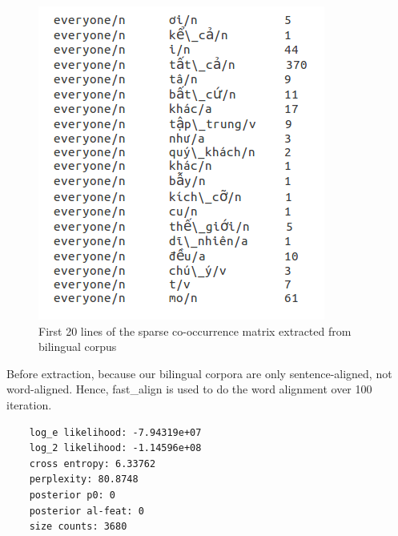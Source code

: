 \documentclass[12pt]{article}
\begin{document}
\begin{figure}[H]
	\centering
	\includegraphics[scale=0.7]{bilingual_sparse_matrix}
	\caption{First 20 lines of the sparse co-occurrence matrix extracted from bilingual corpus}
\end{figure}

Before extraction, because our bilingual corpora are only sentence-aligned, not word-aligned. Hence, fast\_align\cite{dyer2013simple} is used to do the word alignment over 100 iteration.

\begin{verbatim}
	log_e likelihood: -7.94319e+07
	log_2 likelihood: -1.14596e+08
	cross entropy: 6.33762
	perplexity: 80.8748
	posterior p0: 0
	posterior al-feat: 0
	size counts: 3680
\end{verbatim}
\end{document}
